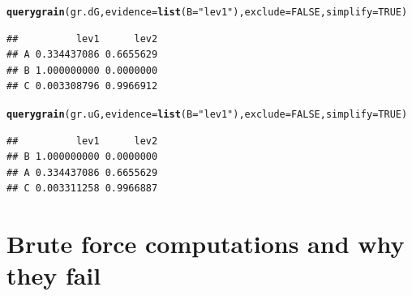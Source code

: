 \documentclass[10pt]{article}\usepackage[]{graphicx}\usepackage[]{xcolor}
\makeatletter
\newcommand{\hlnum}[1]{\textcolor[rgb]{0.686,0.059,0.569}{#1}}%
\newcommand{\hlstr}[1]{\textcolor[rgb]{0.192,0.494,0.8}{#1}}%
\newcommand{\hlstd}[1]{\textcolor[rgb]{0.345,0.345,0.345}{#1}}%
\newcommand{\hlkwc}[1]{\textcolor[rgb]{0.333,0.667,0.333}{#1}}%
\newcommand{\hlkwd}[1]{\textcolor[rgb]{0.737,0.353,0.396}{\textbf{#1}}}%
\newenvironment{kframe}{%
 \def\at@end@of@kframe{}%
 \ifinner\ifhmode%
  \def\at@end@of@kframe{\end{minipage}}%
  \begin{minipage}{\columnwidth}%
 \fi\fi%
 \def\FrameCommand##1{\hskip\@totalleftmargin \hskip-\fboxsep
 \colorbox{shadecolor}{##1}\hskip-\fboxsep
     \hskip-\linewidth \hskip-\@totalleftmargin \hskip\columnwidth}%
 \MakeFramed {\advance\hsize-\width
   \@totalleftmargin\z@ \linewidth\hsize
   \@setminipage}}%
 {\par\unskip\endMakeFramed%
 \at@end@of@kframe}
\newenvironment{knitrout}{}{} %
\makeatother
\begin{document}
\begin{knitrout}
\color{fgcolor}\begin{kframe}
\begin{alltt}
\hlkwd{querygrain}\hlstd{(gr.dG,} \hlkwc{evidence}\hlstd{=}\hlkwd{list}\hlstd{(}\hlkwc{B}\hlstd{=}\hlstr{"lev1"}\hlstd{),} \hlkwc{exclude}\hlstd{=}\hlnum{FALSE}\hlstd{,} \hlkwc{simplify}\hlstd{=}\hlnum{TRUE}\hlstd{)}
\end{alltt}
\begin{verbatim}
##          lev1      lev2
## A 0.334437086 0.6655629
## B 1.000000000 0.0000000
## C 0.003308796 0.9966912
\end{verbatim}
\begin{alltt}
\hlkwd{querygrain}\hlstd{(gr.uG,} \hlkwc{evidence}\hlstd{=}\hlkwd{list}\hlstd{(}\hlkwc{B}\hlstd{=}\hlstr{"lev1"}\hlstd{),} \hlkwc{exclude}\hlstd{=}\hlnum{FALSE}\hlstd{,} \hlkwc{simplify}\hlstd{=}\hlnum{TRUE}\hlstd{)}
\end{alltt}
\begin{verbatim}
##          lev1      lev2
## B 1.000000000 0.0000000
## A 0.334437086 0.6655629
## C 0.003311258 0.9966887
\end{verbatim}
\end{kframe}
\end{knitrout}




\section{Brute force computations and why they fail}
\label{sec:brute-force-comp}
\end{document}
